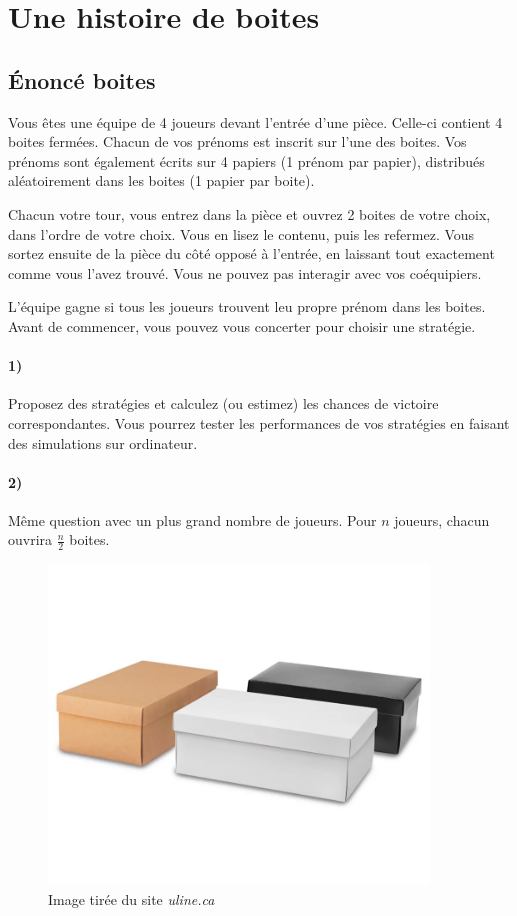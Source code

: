 \documentclass[a4paper,10pt,oneside]{article}
\begin{document}
\section{Une histoire de boites}

\subsection{Énoncé boites}

Vous êtes une équipe de 4 joueurs devant l'entrée d'une pièce. 
Celle-ci contient 4 boites fermées.
Chacun de vos prénoms est inscrit sur l'une des boites.
Vos prénoms sont également écrits sur 4 papiers (1 prénom par papier), distribués aléatoirement dans les boites (1 papier par boite).

Chacun votre tour, vous entrez dans la pièce et ouvrez 2 boites de votre choix, dans l'ordre de votre choix. 
Vous en lisez le contenu, puis les refermez.
Vous sortez ensuite de la pièce du côté opposé à l'entrée, en laissant tout exactement comme vous l'avez trouvé.
Vous ne pouvez pas interagir avec vos coéquipiers.

L'équipe gagne si tous les joueurs trouvent leu propre prénom dans les boites. Avant de commencer, vous pouvez vous concerter pour choisir une stratégie.

\paragraph*{1)}
Proposez des stratégies et calculez (ou estimez) les chances de victoire correspondantes.
Vous pourrez tester les performances de vos stratégies en faisant des simulations sur ordinateur.

\paragraph*{2)} 
Même question avec un plus grand nombre de joueurs. Pour $n$ joueurs, chacun ouvrira $\frac{n}{2}$ boites.

\vspace{3cm}
\begin{figure}[!ht]
  \centering
  \includegraphics[width=0.9\textwidth]{figures/boites.png}
  \caption*{Image tirée du site \textit{uline.ca}}
\end{figure}
\end{document}
